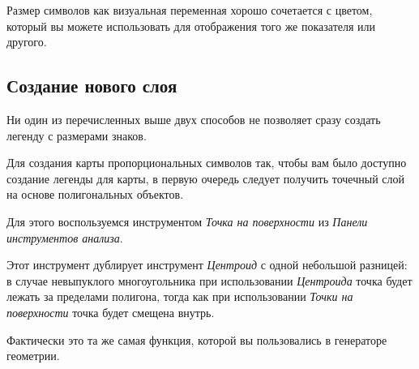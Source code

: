 \documentclass[
  russian,
]{article}
\begin{document}
\begin{tcolorbox}[enhanced jigsaw, arc=.35mm, bottomrule=.15mm, bottomtitle=1mm, breakable, colback=white, colbacktitle=quarto-callout-tip-color!10!white, colframe=quarto-callout-tip-color-frame, coltitle=black, left=2mm, leftrule=.75mm, opacityback=0, opacitybacktitle=0.6, rightrule=.15mm, title=\textcolor{quarto-callout-tip-color}{\faLightbulb}\hspace{0.5em}{Дополнительно}, titlerule=0mm, toprule=.15mm, toptitle=1mm]

Размер символов как визуальная переменная хорошо сочетается с цветом,
который вы можете использовать для отображения того же показателя или
другого.

\end{tcolorbox}

\subsection{Создание нового
слоя}\label{ux441ux43eux437ux434ux430ux43dux438ux435-ux43dux43eux432ux43eux433ux43e-ux441ux43bux43eux44f}

Ни один из перечисленных выше двух способов не позволяет сразу создать
легенду с размерами знаков.

Для создания карты пропорциональных символов так, чтобы вам было
доступно создание легенды для карты, в первую очередь следует получить
точечный слой на основе полигональных объектов.

Для этого воспользуемся инструментом \emph{Точка на поверхности} из
\emph{Панели инструментов анализа}.

\begin{tcolorbox}[enhanced jigsaw, arc=.35mm, bottomrule=.15mm, bottomtitle=1mm, breakable, colback=white, colbacktitle=quarto-callout-note-color!10!white, colframe=quarto-callout-note-color-frame, coltitle=black, left=2mm, leftrule=.75mm, opacityback=0, opacitybacktitle=0.6, rightrule=.15mm, title=\textcolor{quarto-callout-note-color}{\faInfo}\hspace{0.5em}{На заметку}, titlerule=0mm, toprule=.15mm, toptitle=1mm]

Этот инструмент дублирует инструмент \emph{Центроид} с одной небольшой
разницей: в случае невыпуклого многоугольника при использовании
\emph{Центроида} точка будет лежать за пределами полигона, тогда как при
использовании \emph{Точки на поверхности} точка будет смещена внутрь.

Фактически это та же самая функция, которой вы пользовались в генераторе
геометрии.

\end{tcolorbox}
\end{document}
